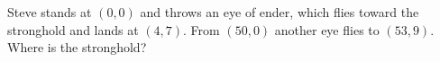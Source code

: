 Steve stands at $(0,0)$ and throws an eye of ender, which flies toward the stronghold and lands at $(4,7)$. From $(50,0)$ another eye flies to $(53,9)$. Where is the stronghold?
